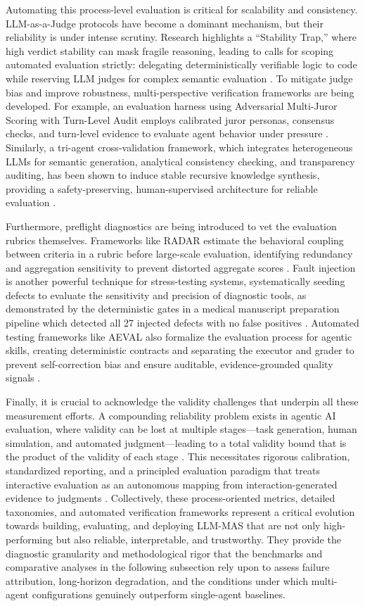 \documentclass[11pt]{article}
\begin{document}
Automating this process-level evaluation is critical for scalability and consistency. LLM-as-a-Judge protocols have become a dominant mechanism, but their reliability is under intense scrutiny. Research highlights a ``Stability Trap,'' where high verdict stability can mask fragile reasoning, leading to calls for scoping automated evaluation strictly: delegating deterministically verifiable logic to code while reserving LLM judges for complex semantic evaluation \cite{ref338}. To mitigate judge bias and improve robustness, multi-perspective verification frameworks are being developed. For example, an evaluation harness using Adversarial Multi-Juror Scoring with Turn-Level Audit employs calibrated juror personas, consensus checks, and turn-level evidence to evaluate agent behavior under pressure \cite{ref339}. Similarly, a tri-agent cross-validation framework, which integrates heterogeneous LLMs for semantic generation, analytical consistency checking, and transparency auditing, has been shown to induce stable recursive knowledge synthesis, providing a safety-preserving, human-supervised architecture for reliable evaluation \cite{ref340}.

Furthermore, preflight diagnostics are being introduced to vet the evaluation rubrics themselves. Frameworks like RADAR estimate the behavioral coupling between criteria in a rubric before large-scale evaluation, identifying redundancy and aggregation sensitivity to prevent distorted aggregate scores \cite{ref341}. Fault injection is another powerful technique for stress-testing systems, systematically seeding defects to evaluate the sensitivity and precision of diagnostic tools, as demonstrated by the deterministic gates in a medical manuscript preparation pipeline which detected all 27 injected defects with no false positives \cite{ref332}. Automated testing frameworks like AEVAL also formalize the evaluation process for agentic skills, creating deterministic contracts and separating the executor and grader to prevent self-correction bias and ensure auditable, evidence-grounded quality signals \cite{ref342}.

Finally, it is crucial to acknowledge the validity challenges that underpin all these measurement efforts. A compounding reliability problem exists in agentic AI evaluation, where validity can be lost at multiple stages---task generation, human simulation, and automated judgment---leading to a total validity bound that is the product of the validity of each stage \cite{ref343}. This necessitates rigorous calibration, standardized reporting, and a principled evaluation paradigm that treats interactive evaluation as an autonomous mapping from interaction-generated evidence to judgments \cite{ref344}. Collectively, these process-oriented metrics, detailed taxonomies, and automated verification frameworks represent a critical evolution towards building, evaluating, and deploying LLM-MAS that are not only high-performing but also reliable, interpretable, and trustworthy. They provide the diagnostic granularity and methodological rigor that the benchmarks and comparative analyses in the following subsection rely upon to assess failure attribution, long-horizon degradation, and the conditions under which multi-agent configurations genuinely outperform single-agent baselines.
\end{document}

